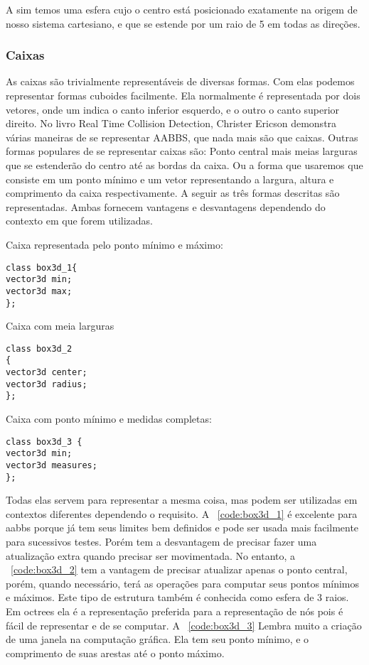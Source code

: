 A sim temos uma esfera cujo o centro está posicionado exatamente na origem de
nosso sistema cartesiano, e que se estende por um raio de 5 em todas as
direções.

\subsubsection{Caixas}

As caixas são trivialmente representáveis de diversas formas. Com elas podemos
representar formas cuboides facilmente. Ela normalmente é representada por dois
vetores, onde um indica o canto inferior esquerdo, e o outro o canto superior
direito. No livro Real Time Collision Detection, Christer Ericson demonstra
várias maneiras de se representar AABBS, que nada mais são que caixas.
Outras formas populares de se representar caixas são:
Ponto central mais meias larguras que se estenderão do centro até as bordas da caixa.
Ou a forma que usaremos que consiste em um ponto mínimo e um vetor
representando a largura, altura e comprimento da caixa respectivamente.
A seguir as três formas descritas são representadas. Ambas fornecem vantagens e
desvantagens dependendo do contexto em que forem utilizadas.

Caixa representada pelo ponto mínimo e máximo:

\begin{lstlisting}[frame=single,caption=Representação de caixa\label{code:box3d_1}]
class box3d_1{
vector3d min;
vector3d max;
};
\end{lstlisting}

Caixa com meia larguras

\begin{lstlisting}[frame=single,caption=Exemplo de caixa 2\label{code:box3d_2}]
class box3d_2
{
vector3d center;
vector3d radius;
};
\end{lstlisting}

Caixa com ponto mínimo e medidas completas:

\begin{lstlisting}[frame=single,caption=Exemplo de caixa 3\label{code:box3d_3}]
class box3d_3 {
vector3d min;
vector3d measures;
};
\end{lstlisting}

Todas elas servem para representar a mesma coisa, mas podem ser utilizadas em
contextos diferentes dependendo o requisito. A ~\ref{code:box3d_1} é excelente para aabbs
porque já tem seus limites bem definidos e pode ser usada mais facilmente para
sucessivos testes. Porém tem a desvantagem de precisar fazer uma atualização
extra quando precisar ser movimentada.
No entanto, a ~\ref{code:box3d_2} tem a vantagem de precisar atualizar apenas o ponto
central, porém, quando necessário, terá as operações para computar seus pontos
mínimos e máximos. Este tipo de estrutura também é conhecida como esfera de 3
raios. Em octrees ela é a representação preferida para a representação de nós
pois é fácil de representar e de se computar.
A ~\ref{code:box3d_3} Lembra muito a criação de uma janela na computação gráfica. Ela tem seu
ponto mínimo, e o comprimento de suas arestas até o ponto máximo.

